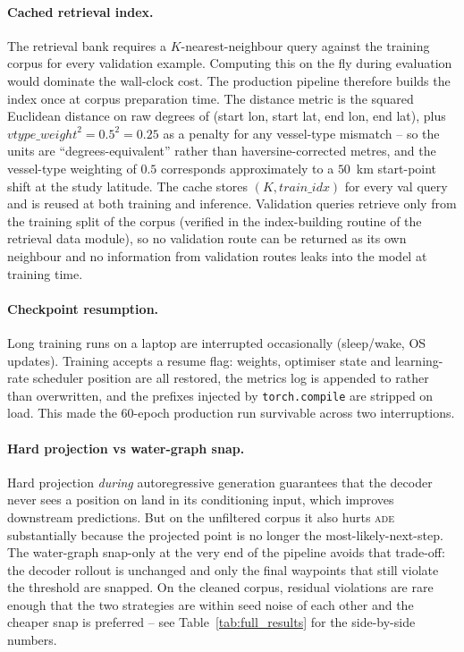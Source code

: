 \documentclass[oneside, a4paper, onecolumn, 11pt]{article}
\newcommand{\ade}{\textsc{ade}}
\begin{document}
\paragraph{Cached retrieval index.}
The retrieval bank requires a $K$-nearest-neighbour query against the
training corpus for every validation example.  Computing this on the
fly during evaluation would dominate the wall-clock cost.  The
production pipeline therefore builds the index once at corpus
preparation time.  The distance metric is the squared Euclidean
distance on raw degrees of (start lon, start lat, end lon, end lat),
plus $\mathit{vtype\_weight}^2 = 0.5^2 = 0.25$ as a penalty for any
vessel-type mismatch -- so the units are ``degrees-equivalent'' rather
than haversine-corrected metres, and the vessel-type weighting of
$0.5$ corresponds approximately to a $50$~km start-point shift at the
study latitude.  The cache stores
$(K, \mathit{train\_idx})$ for every val query and is reused at both
training and inference.
Validation queries retrieve only from the training split of the corpus
(verified in the index-building routine of the retrieval data module),
so no validation route can be returned as its own neighbour and no
information from validation routes leaks into the model at training
time.

\paragraph{Checkpoint resumption.}
Long training runs on a laptop are interrupted occasionally
(sleep/wake, OS updates).  Training accepts a resume flag: weights,
optimiser state and learning-rate scheduler position are all restored,
the metrics log is appended to rather than overwritten, and the
prefixes injected by \texttt{torch.compile} are stripped on load.  This made the
60-epoch production run survivable across two interruptions.

\paragraph{Hard projection vs water-graph snap.}
Hard projection \emph{during} autoregressive generation guarantees that
the decoder never sees a position on land in its conditioning input,
which improves downstream predictions.  But on the unfiltered corpus
it also hurts \ade{} substantially because the projected point is no
longer the most-likely-next-step.  The water-graph snap-only at the
very end of the pipeline avoids that trade-off: the decoder rollout is
unchanged and only the final waypoints that still violate the
threshold are snapped.  On the cleaned corpus, residual violations are
rare enough that the two strategies are within seed noise of each
other and the cheaper snap is preferred -- see
Table~\ref{tab:full_results} for the side-by-side numbers.
\end{document}

